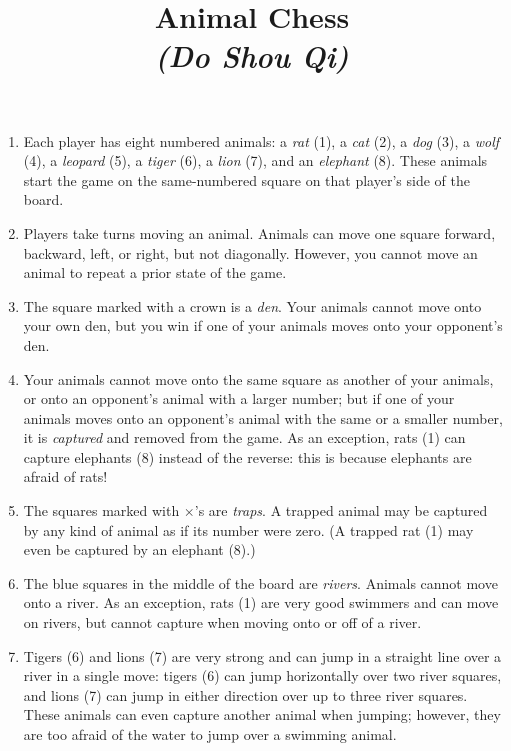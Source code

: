 \documentclass[12pt]{article}
\title{Animal Chess\\\textit{(Do Shou Qi)}}
\author{}
\date{}
\begin{document}
\maketitle

\begin{enumerate}
\item Each player has eight numbered animals: a \textit{rat} (1), a
\textit{cat} (2), a \textit{dog} (3), a \textit{wolf} (4), a \textit{leopard}
(5), a \textit{tiger} (6), a \textit{lion} (7), and an \textit{elephant} (8).
These animals start the game on the same-numbered square on that player's side
of the board.

\item Players take turns moving an animal. Animals can move one square forward,
backward, left, or right, but not diagonally. However, you cannot move an
animal to repeat a prior state of the game.

\item The square marked with a crown is a \textit{den}. Your animals cannot
move onto your own den, but you win if one of your animals moves onto your
opponent's den.

\item Your animals cannot move onto the same square as another of your animals,
or onto an opponent's animal with a larger number; but if one of your animals
moves onto an opponent's animal with the same or a smaller number, it is
\textit{captured} and removed from the game. As an exception, rats (1) can
capture elephants (8) instead of the reverse: this is because elephants are
afraid of rats!

\item The squares marked with $\times$'s are \textit{traps}. A trapped animal
may be captured by any kind of animal as if its number were zero. (A trapped
rat (1) may even be captured by an elephant (8).)

\item The blue squares in the middle of the board are \textit{rivers}. Animals
cannot move onto a river. As an exception, rats (1) are very good swimmers
and can move on rivers, but cannot capture when moving onto or off of a river.

\item Tigers (6) and lions (7) are very strong and can jump in a straight
line over a river in a single move: tigers (6) can jump horizontally over
two river squares, and lions (7) can jump in either direction over up to three
river squares. These animals can even capture another animal when jumping;
however, they are too afraid of the water to jump over a swimming animal.
\end{enumerate}
\end{document}
